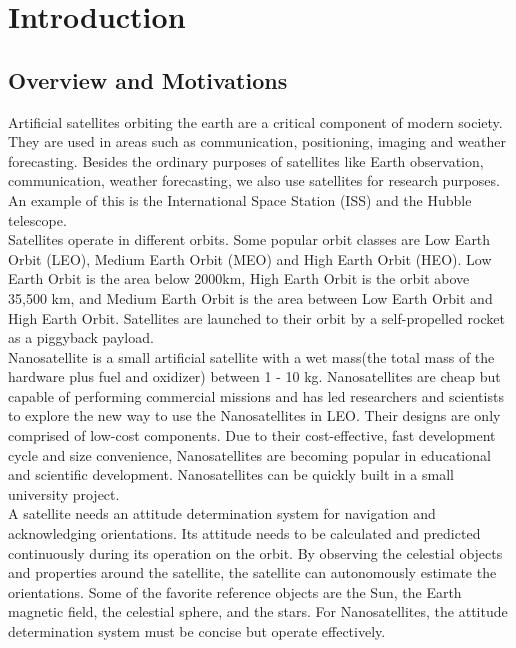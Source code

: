 
\chapter{Introduction}
\label{chap:intro}

\section{Overview and Motivations}

Artificial satellites orbiting the earth are a critical component of modern society. They are used in areas such as communication, positioning, imaging and weather forecasting. Besides the ordinary purposes of satellites like Earth observation, communication, weather forecasting\cite{How_satellites_rule_our_world}, we also use satellites for research purposes. An example of this is the International Space Station (ISS) and the Hubble telescope. \\

\noindent Satellites operate in different orbits. Some popular orbit classes are Low Earth Orbit (LEO), Medium Earth Orbit (MEO) and High Earth Orbit (HEO)\cite{sat_wiki}. Low Earth Orbit is the area below 2000km, High Earth Orbit is the orbit above 35,500 km, and Medium Earth Orbit is the area between Low Earth Orbit and High Earth Orbit. Satellites are launched to their orbit by a self-propelled rocket as a piggyback payload. \\

\noindent Nanosatellite is a small artificial satellite with a wet mass(the total mass of the hardware plus fuel and oxidizer) between 1 - 10 kg. Nanosatellites are cheap but capable of performing commercial missions and has led researchers and scientists to explore the new way to use the Nanosatellites in LEO\cite{network}. Their designs are only comprised of low-cost components. Due to their cost-effective, fast development cycle and size convenience, Nanosatellites are becoming popular in educational and scientific development. Nanosatellites can be quickly built in a small university project. \\

\noindent A satellite needs an attitude determination system for navigation and acknowledging orientations. Its attitude needs to be calculated and predicted continuously during its operation on the orbit. By observing the celestial objects and properties around the satellite, the satellite can autonomously estimate the orientations. Some of the favorite reference objects are the Sun, the Earth magnetic field, the celestial sphere, and the stars. For Nanosatellites, the attitude determination system must be concise but operate effectively.

